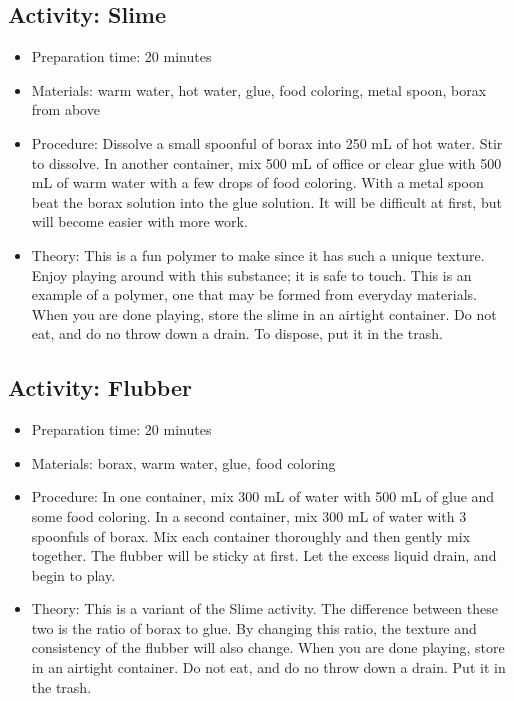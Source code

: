\begin{itemize}
{\begin{itemize}
\subsection{Activity: Slime}
\begin{itemize}
\item{Preparation time: 20 minutes}
\item{Materials: warm water, hot water, glue, food coloring, metal spoon, borax from above}
\item{Procedure: Dissolve a small spoonful of borax into 250 mL of hot water. Stir to dissolve. In another container, mix 500 mL of office or clear glue with 500 mL of warm water with a few drops of food coloring. With a metal spoon beat the borax solution into the glue solution. It will be difficult at first, but will become easier with more work.}
\item{Theory: This is a fun polymer to make since it has such a unique texture. Enjoy playing around with this substance; it is safe to touch. This is an example of a polymer, one that may be formed from everyday materials. When you are done playing, store the slime in an airtight container. Do not eat, and do no throw down a drain. To dispose, put it in the trash.}
\end{itemize}

\subsection{Activity: Flubber}
\begin{itemize}
\item{Preparation time: 20 minutes}
\item{Materials: borax, warm water, glue, food coloring}
\item{Procedure: In one container, mix 300 mL of water with 500 mL of glue and some food coloring. In a second container, mix 300 mL of water with 3 spoonfuls of borax. Mix each container thoroughly and then gently mix together. The flubber will be sticky at first. Let the excess liquid drain, and begin to play.}
\item{Theory: This is a variant of the Slime activity. The difference between these two is the ratio of borax to glue. By changing this ratio, the texture and consistency of the flubber will also change. When you are done playing, store in an airtight container. Do not eat, and do no throw down a drain. Put it in the trash.}
\end{itemize}


\end{itemize}}
\end{itemize}
